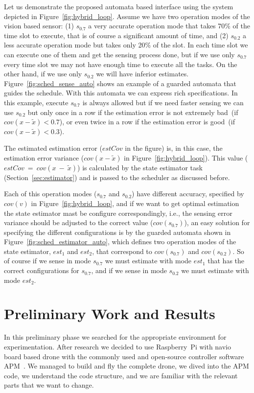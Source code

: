 \documentclass[11pt]{article}
\begin{document}
Let us demonstrate the proposed automata based interface using the system depicted in Figure~\ref{fig:hybrid_loop}.
Assume we have two operation modes of the vision based sensor: (1) $s_{0.7}$ a very accurate operation mode that takes 70\% of the time slot to execute, that is of course a significant amount of time, and (2) $s_{0.2}$ a less accurate operation mode but takes only 20\% of the slot.
In each time slot we can execute one of them and get the sensing process done, but if we use only $s_{0.7}$ every time slot we may not have enough time to execute all the tasks. On the other hand, if we use only $s_{0.2}$ we will have inferior estimates.
Figure~\ref{fig:sched_sense_auto} shows an example of a guarded automata that guides the schedule. With this automata we can express rich specifications. 
In this example, execute $s_{0.7}$ is always allowed but if we need faster sensing we can use $s_{0.2}$ but only once in a row if the estimation error is not extremely bad~(if~$cov(x-\tilde{x}) < 0.7$), or even twice in a row if the estimation error is good~(if~$cov(x-\tilde{x}) < 0.3$).

The estimated estimation error ($estCov$ in the figure) is, in this case, the estimation error variance ($cov(x-\tilde{x})$ in Figure~\ref{fig:hybrid_loop}). 
This value ($estCov~=~cov(x~-~\tilde{x})$) is calculated by the state estimator task (Section~\ref{sec:estimator}) and is passed to the scheduler as discussed before.

Each of this operation modes ($s_{0.7}$ and $s_{0.2}$) have different accuracy, specified by $cov(v)$ in Figure~\ref{fig:hybrid_loop}, and if we want to get optimal estimation the state estimator mast be configure correspondingly, i.e., the sensing error variance should be adjusted to the correct value ($cov(s_{0.7})$), an easy solution for specifying the different configurations is by the guarded automata shown in Figure~\ref{fig:sched_estimator_auto}, which defines two operation modes of the state estimator, $est_1$ and $est_2$, that correspond to $cov(s_{0.7})$ and $cov(s_{0.2})$. So of course if we sense in mode $s_{0.7}$ we must estimate with mode $est_1$ that has the correct configurations for $s_{0.7}$, and if we sense in mode $s_{0.2}$ we must estimate with mode $est_2$.

\section{Preliminary Work and Results}
\label{sec:results}
In this preliminary phase we searched for the appropriate environment for experimentation. After research we decided to use Raspberry~Pi with navio~\cite{navio} board based drone with the commonly used and open-source controller software APM~\cite{APM}.
We managed to build and fly the complete drone, we dived into the APM code, we understand the code structure, and we are familiar with the relevant parts that we want to change.
\end{document}
